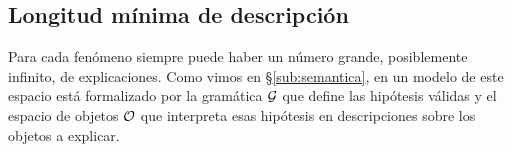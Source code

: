 




\subsection{Longitud mínima de descripción}


Para cada fenómeno siempre puede haber un número grande, posiblemente infinito, de explicaciones. Como vimos en  \S\ref{sub:semantica}, en un modelo de \lot este espacio está formalizado por la gramática $\gram$ que define las hipótesis válidas y el espacio de objetos $\+O$ que interpreta esas hipótesis en descripciones sobre los objetos a explicar. 

